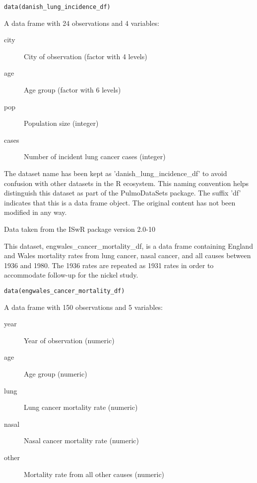 \documentclass[a4paper]{book}
\begin{document}
%
\begin{Usage}
\begin{verbatim}
data(danish_lung_incidence_df)
\end{verbatim}
\end{Usage}
%
\begin{Format}
A data frame with 24 observations and 4 variables:
\begin{description}

\item[city] City of observation (factor with 4 levels)
\item[age] Age group (factor with 6 levels)
\item[pop] Population size (integer)
\item[cases] Number of incident lung cancer cases (integer)

\end{description}

\end{Format}
%
\begin{Details}
The dataset name has been kept as 'danish\_lung\_incidence\_df' to avoid confusion
with other datasets in the R ecosystem. This naming convention helps distinguish
this dataset as part of the PulmoDataSets package. The suffix 'df' indicates
that this is a data frame object. The original content has not been modified
in any way.
\end{Details}
%
\begin{Source}
Data taken from the ISwR package version 2.0-10
\end{Source}
%
\begin{Description}
This dataset, engwales\_cancer\_mortality\_df, is a data frame containing England and Wales
mortality rates from lung cancer, nasal cancer, and all causes between 1936 and 1980.
The 1936 rates are repeated as 1931 rates in order to accommodate follow-up for the nickel study.
\end{Description}
%
\begin{Usage}
\begin{verbatim}
data(engwales_cancer_mortality_df)
\end{verbatim}
\end{Usage}
%
\begin{Format}
A data frame with 150 observations and 5 variables:
\begin{description}

\item[year] Year of observation (numeric)
\item[age] Age group (numeric)
\item[lung] Lung cancer mortality rate (numeric)
\item[nasal] Nasal cancer mortality rate (numeric)
\item[other] Mortality rate from all other causes (numeric)

\end{description}

\end{Format}
\end{document}
